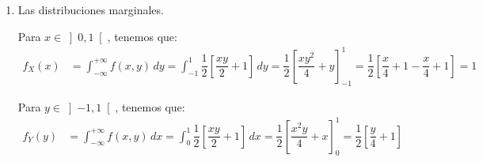 \begin{ejercicio}
\begin{enumerate}
\begin{itemize}
            \item \ul{Si $y\geq 1$  $x\geq 1$} (zona $R_5$):
            \begin{equation*}
                F_{(X,Y)}(x, y) = 1.
            \end{equation*}
        \end{itemize}

        Por tanto, tenemos que:
        \begin{equation*}
            F_{(X,Y)}(x, y) = \begin{cases}
                0, & x\leq 0 \text{ o } y\leq -1, \\
                \dfrac{x^2y^2}{16}+\dfrac{xy}{2}-\dfrac{x^2}{16}+\dfrac{x}{2}, & x\in \left]0,1\right[ \text{ y } y\in \left]-1,1\right[, \\
                x, & x\in \left]0,1\right[ \text{ y } y\geq 1,\\
                \dfrac{y^2}{16}+\dfrac{y}{2}+\dfrac{7}{16}, & y\in \left]-1,1\right[ \text{ y } x\geq 1, \\
                1, & y\geq 1 \text{ y } x\geq 1.
            \end{cases}
        \end{equation*}
            

        \item Las distribuciones marginales.
        
        Para $x\in \left]0,1\right[$, tenemos que:
        \begin{align*}
            f_X(x) &= \int_{-\infty}^{+\infty} f(x, y) \, dy = \int_{-1}^{1} \dfrac{1}{2}\left[\dfrac{xy}{2}+1\right] \, dy = \dfrac{1}{2}\left[\dfrac{xy^2}{4}+y\right]_{-1}^1 = \dfrac{1}{2}\left[\dfrac{x}{4}+1-\dfrac{x}{4}+1\right] = 1
        \end{align*}

        Para $y\in \left]-1,1\right[$, tenemos que:
        \begin{align*}
            f_Y(y) &= \int_{-\infty}^{+\infty} f(x, y) \, dx = \int_{0}^{1} \dfrac{1}{2}\left[\dfrac{xy}{2}+1\right] \, dx = \dfrac{1}{2}\left[\dfrac{x^2y}{4}+x\right]_{0}^1 = \dfrac{1}{2}\left[\dfrac{y}{4}+1\right]
        \end{align*}
    \end{enumerate}
\end{ejercicio}

